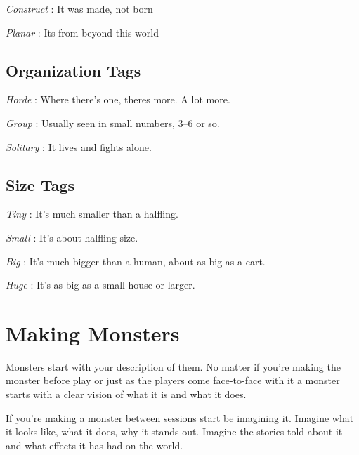        

         {\em Construct} : It was made, not born

       

         {\em Planar} : Its from beyond this world

       
\subsection{Organization Tags}    
       

         {\em Horde} : Where there's one, theres more. A lot more.

       

         {\em Group} : Usually seen in small numbers, 3–6 or so.

       

         {\em Solitary} : It lives and fights alone.

       
\subsection{Size Tags}    
       

         {\em Tiny} : It's much smaller than a halfling.

       

         {\em Small} : It's about halfling size.

       

         {\em Big} : It's much bigger than a human, about as big as a cart.

       

         {\em Huge} : It's as big as a small house or larger.

       
\section{Making Monsters}   
       

Monsters start with your description of them. No matter if you're making the monster before play or just as the players come face-to-face with it a monster starts with a clear vision of what it is and what it does.

       

If you're making a monster between sessions start be imagining it. Imagine what it looks like, what it does, why it stands out. Imagine the stories told about it and what effects it has had on the world.

